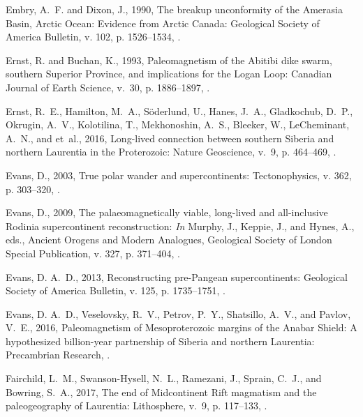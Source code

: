 \documentclass[11pt,letterpaper]{article}
\begin{document}
\begin{thebibliography}{153}
Embry, A.~F. and Dixon, J., 1990, {The breakup unconformity of the Amerasia
  Basin, Arctic Ocean: Evidence from Arctic Canada}: Geological Society of
  America Bulletin, v. 102, p. 1526--1534,
  .

Ernst, R. and Buchan, K., 1993, Paleomagnetism of the {A}bitibi dike swarm,
  southern {S}uperior {P}rovince, and implications for the {L}ogan {L}oop:
  Canadian Journal of Earth Science, v.~30, p. 1886--1897,
  .

Ernst, R.~E., Hamilton, M.~A., S{\"o}derlund, U., Hanes, J.~A., Gladkochub,
  D.~P., Okrugin, A.~V., Kolotilina, T., Mekhonoshin, A.~S., Bleeker, W.,
  LeCheminant, A.~N., and et~al., 2016, {Long-lived connection between southern
  Siberia and northern Laurentia in the Proterozoic}: Nature Geoscience, v.~9,
  p. 464--469, .

Evans, D., 2003, True polar wander and supercontinents: Tectonophysics, v. 362,
  p. 303--320, .

Evans, D., 2009, The palaeomagnetically viable, long-lived and all-inclusive
  {R}odinia supercontinent reconstruction: \emph{In} Murphy, J., Keppie, J.,
  and Hynes, A., eds., Ancient Orogens and Modern Analogues, Geological Society
  of London Special Publication, v. 327, p. 371--404, .

Evans, D. A.~D., 2013, Reconstructing pre-{P}angean supercontinents: Geological
  Society of America Bulletin, v. 125, p. 1735--1751, .

Evans, D. A.~D., Veselovsky, R.~V., Petrov, P.~Y., Shatsillo, A.~V., and
  Pavlov, V.~E., 2016, {Paleomagnetism of Mesoproterozoic margins of the Anabar
  Shield: A hypothesized billion-year partnership of Siberia and northern
  Laurentia}: Precambrian Research, .

Fairchild, L.~M., Swanson-Hysell, N.~L., Ramezani, J., Sprain, C.~J., and
  Bowring, S.~A., 2017, {The end of Midcontinent Rift magmatism and the
  paleogeography of Laurentia}: Lithosphere, v.~9, p. 117--133,
  .


\end{thebibliography}
\end{document}
